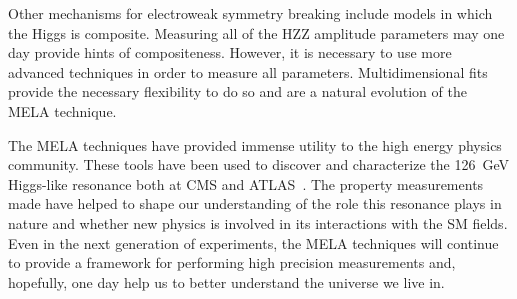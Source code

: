 Other mechanisms for electroweak symmetry breaking include 
models in which the Higgs is composite.  Measuring all of
the HZZ amplitude parameters may one day provide
hints of compositeness.  However, it is necessary to use 
more advanced techniques in order to measure all parameters.
Multidimensional fits provide the necessary flexibility to do
so and are a natural evolution of the MELA technique.
  
The MELA techniques have provided immense utility
to the high energy physics community.  These tools have been used 
to discover and characterize the 126~GeV Higgs-like
resonance both at CMS and ATLAS~\cite{ATLAS:2013nma}.  The property
measurements made have helped to shape our understanding of the
role this resonance plays in nature and whether new physics is
involved in its interactions with the SM fields.  Even in the next 
generation of experiments, the MELA techniques will
continue to provide a framework for performing high precision
measurements and, hopefully, one day help us to better understand
the universe we live in.



